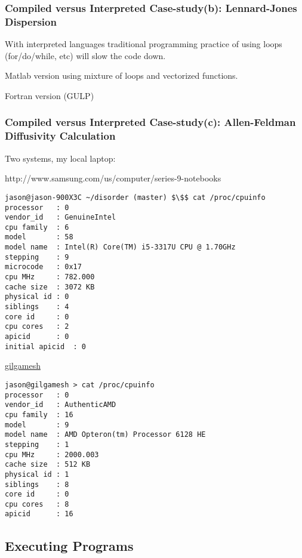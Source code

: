 \subsubsection{\label{A:coding_lang:case2}Compiled versus Interpreted 
Case-study(b): Lennard-Jones Dispersion}

With interpreted languages traditional programming practice of using 
loops (for/do/while, etc) will slow the code down.  

Matlab version using mixture of loops and vectorized functions.

Fortran version (GULP) 

\subsubsection{\label{A:coding_lang:case3}Compiled versus Interpreted 
Case-study(c): Allen-Feldman Diffusivity Calculation}

Two systems, my local laptop:

http://www.samsung.com/us/computer/series-9-notebooks


\begin{lstlisting}
jason@jason-900X3C ~/disorder (master) $\$$ cat /proc/cpuinfo 
processor	: 0
vendor_id	: GenuineIntel
cpu family	: 6
model		: 58
model name	: Intel(R) Core(TM) i5-3317U CPU @ 1.70GHz
stepping	: 9
microcode	: 0x17
cpu MHz		: 782.000
cache size	: 3072 KB
physical id	: 0
siblings	: 4
core id		: 0
cpu cores	: 2
apicid		: 0
initial apicid	: 0
\end{lstlisting}


\href{http://gilgamesh.cheme.cmu.edu/doc/gilgamesh.html}{gilgamesh}



\begin{lstlisting}
jason@gilgamesh > cat /proc/cpuinfo
processor	: 0
vendor_id	: AuthenticAMD
cpu family	: 16
model		: 9
model name	: AMD Opteron(tm) Processor 6128 HE
stepping	: 1
cpu MHz		: 2000.003
cache size	: 512 KB
physical id	: 1
siblings	: 8
core id		: 0
cpu cores	: 8
apicid		: 16
\end{lstlisting}

\subsection{\label{A:coding_lang:Execute}Executing Programs}

